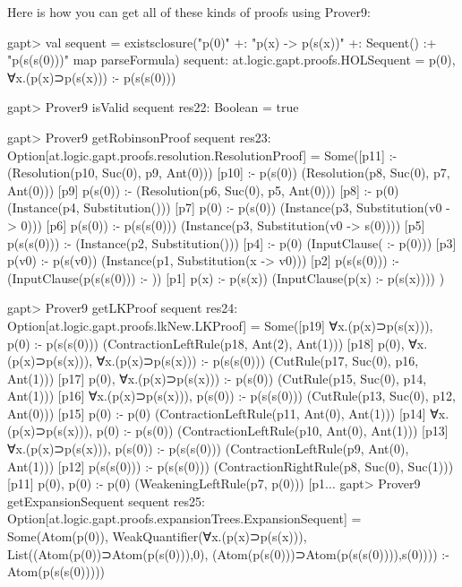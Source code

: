 \documentclass[a4paper,11pt]{article}
\begin{document}
Here is how you can get all of these kinds of proofs using Prover9:
\begin{clilisting}
gapt> val sequent = existsclosure("p(0)" +: "p(x) -> p(s(x))" +: Sequent() :+ "p(s(s(0)))" map parseFormula)
sequent: at.logic.gapt.proofs.HOLSequent = p(0), ∀x.(p(x)⊃p(s(x))) :- p(s(s(0)))

gapt> Prover9 isValid sequent
res22: Boolean = true

gapt> Prover9 getRobinsonProof sequent
res23: Option[at.logic.gapt.proofs.resolution.ResolutionProof] =
Some([p11]  :-     (Resolution(p10, Suc(0), p9, Ant(0)))
[p10]  :- p(s(0))    (Resolution(p8, Suc(0), p7, Ant(0)))
[p9] p(s(0)) :-     (Resolution(p6, Suc(0), p5, Ant(0)))
[p8]  :- p(0)    (Instance(p4, Substitution()))
[p7] p(0) :- p(s(0))    (Instance(p3, Substitution(v0 -> 0)))
[p6] p(s(0)) :- p(s(s(0)))    (Instance(p3, Substitution(v0 -> s(0))))
[p5] p(s(s(0))) :-     (Instance(p2, Substitution()))
[p4]  :- p(0)    (InputClause( :- p(0)))
[p3] p(v0) :- p(s(v0))    (Instance(p1, Substitution(x -> v0)))
[p2] p(s(s(0))) :-     (InputClause(p(s(s(0))) :- ))
[p1] p(x) :- p(s(x))    (InputClause(p(x) :- p(s(x))))
)

gapt> Prover9 getLKProof sequent
res24: Option[at.logic.gapt.proofs.lkNew.LKProof] =
Some([p19] ∀x.(p(x)⊃p(s(x))), p(0) :- p(s(s(0)))    (ContractionLeftRule(p18, Ant(2), Ant(1)))
[p18] p(0), ∀x.(p(x)⊃p(s(x))), ∀x.(p(x)⊃p(s(x))) :- p(s(s(0)))    (CutRule(p17, Suc(0), p16, Ant(1)))
[p17] p(0), ∀x.(p(x)⊃p(s(x))) :- p(s(0))    (CutRule(p15, Suc(0), p14, Ant(1)))
[p16] ∀x.(p(x)⊃p(s(x))), p(s(0)) :- p(s(s(0)))    (CutRule(p13, Suc(0), p12, Ant(0)))
[p15] p(0) :- p(0)    (ContractionLeftRule(p11, Ant(0), Ant(1)))
[p14] ∀x.(p(x)⊃p(s(x))), p(0) :- p(s(0))    (ContractionLeftRule(p10, Ant(0), Ant(1)))
[p13] ∀x.(p(x)⊃p(s(x))), p(s(0)) :- p(s(s(0)))    (ContractionLeftRule(p9, Ant(0), Ant(1)))
[p12] p(s(s(0))) :- p(s(s(0)))    (ContractionRightRule(p8, Suc(0), Suc(1)))
[p11] p(0), p(0) :- p(0)    (WeakeningLeftRule(p7, p(0)))
[p1...
gapt> Prover9 getExpansionSequent sequent
res25: Option[at.logic.gapt.proofs.expansionTrees.ExpansionSequent] = Some(Atom(p(0)), WeakQuantifier(∀x.(p(x)⊃p(s(x))), List((Atom(p(0))⊃Atom(p(s(0))),0), (Atom(p(s(0)))⊃Atom(p(s(s(0)))),s(0)))) :- Atom(p(s(s(0)))))

\end{clilisting}
\end{document}
